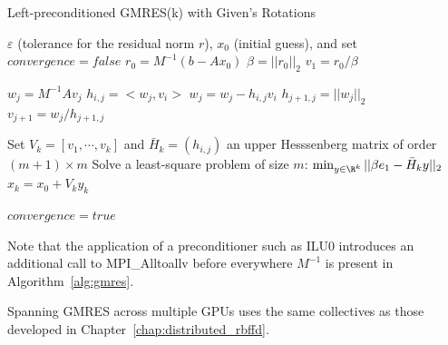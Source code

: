 \begin{algorithm}                      %
\caption{Left-preconditioned GMRES(k) with Given's Rotations}          %
\label{alg:gmres}                           %
\begin{algorithmic}[1]                    %
    \State $\varepsilon$ (tolerance for the residual norm $r$), $x_0$ (initial guess), and set $convergence = false$
    \State $r_0 = M^{-1} (b-Ax_0)$
    \State $\beta = ||r_0||_2$			
    \State $v_1 = r_0 / \beta$ 

			\State $w_j = M^{-1} A v_j$   
				\State $h_{i,j} = <w_j, v_i>$ 
				\State $w_j = w_j - h_{i,j} v_i$
			\EndFor %
			\State $h_{j+1, j}  = ||w_j||_2$		
			\State $v_{j+1} = w_j / h_{j+1,j}$		
	\EndFor %

			\State Set $V_k = [v_1, \cdots, v_k]$ and $\bar{H}_k = (h_{i,j})$ an upper Hesssenberg matrix of order $(m+1)\times m$
			\State Solve a least-square problem of size $m$: $\min_{y \in \R^k} ||\beta e_1 - \bar{H}_k y||_2$ %
			\State $x_k = x_0 + V_k y_k$ %

		\State $convergence = true$
	\EndIf
    \EndWhile
\end{algorithmic}
\end{algorithm}



Note that the application of a preconditioner such as ILU0 introduces an additional call to MPI\_Alltoallv before everywhere $M^{-1}$ is present in Algorithm~\ref{alg:gmres}.

Spanning GMRES across multiple GPUs uses the same collectives as those developed in Chapter~\ref{chap:distributed_rbffd}. 


